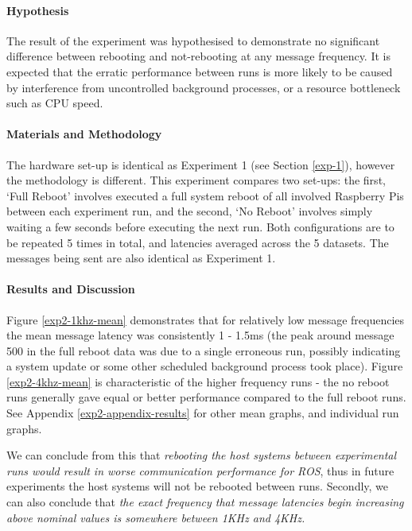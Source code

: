 \documentclass[../dissertation.tex]{subfiles}
\begin{document}
\paragraph{Hypothesis} The result of the experiment was hypothesised to demonstrate no significant difference between rebooting and not-rebooting at any message frequency. It is expected that the erratic performance between runs is more likely to be caused by interference from uncontrolled background processes, or a resource bottleneck such as CPU speed.

\paragraph{Materials and Methodology} The hardware set-up is identical as Experiment 1 (see Section \ref{exp-1}), however the methodology is different. This experiment compares two set-ups: the first, `Full Reboot' involves executed a full system reboot of all involved Raspberry Pis between each experiment run, and the second, `No Reboot' involves simply waiting a few seconds before executing the next run. Both configurations are to be repeated 5 times in total, and latencies averaged across the 5 datasets. The messages being sent are also identical as Experiment 1.

\paragraph{Results and Discussion} Figure \ref{exp2-1khz-mean} demonstrates that for relatively low message frequencies the mean message latency was consistently 1 - 1.5ms (the peak around message 500 in the full reboot data was due to a single erroneous run, possibly indicating a system update or some other scheduled background process took place). Figure \ref{exp2-4khz-mean} is characteristic of the higher frequency runs - the no reboot runs generally gave equal or better performance compared to the full reboot runs. See Appendix \ref{exp2-appendix-results} for other mean graphs, and individual run graphs.

We can conclude from this that \textit{rebooting the host systems between experimental runs would result in worse communication performance for ROS}, thus in future experiments the host systems will not be rebooted between runs. Secondly, we can also conclude that \textit{the exact frequency that message latencies begin increasing above nominal values is somewhere between 1KHz and 4KHz.}
\end{document}
